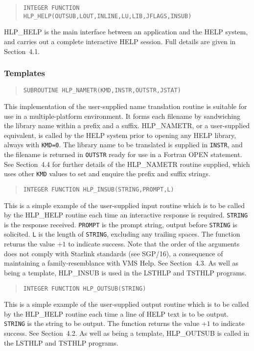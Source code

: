 \begin{verse}
\verb|INTEGER FUNCTION HLP_HELP(OUTSUB,LOUT,INLINE,LU,LIB,JFLAGS,INSUB)|
\end{verse}
HLP\_HELP is the main interface between an application and the
HELP system, and carries out a complete interactive HELP session.
Full details are given in Section~4.1.

\subsubsection{Templates}
\begin{verse}
\verb|SUBROUTINE HLP_NAMETR(KMD,INSTR,OUTSTR,JSTAT)|
\end{verse}
This implementation of the user-supplied name translation routine is
suitable for use in a multiple-platform environment.  It forms each
filename by sandwiching the library name within a prefix and a suffix.
HLP\_NAMETR, or a user-supplied equivalent, is called by the
HELP system prior to opening any HELP library, always
with \verb|KMD=0|.  The
library name to be translated is supplied in \verb|INSTR|, and
the filename is returned in \verb|OUTSTR| ready for use in a
Fortran OPEN statement.
See Section~4.4 for further details of the HLP\_NAMETR routine
supplied, which uses other \verb|KMD| values to set and enquire the
prefix and suffix strings.

\begin{verse}
\verb|INTEGER FUNCTION HLP_INSUB(STRING,PROMPT,L)|
\end{verse}
This is a simple example of the user-supplied input
routine which is to be called by the HLP\_HELP routine each
time an interactive response is required.  \verb|STRING| is the response
received. \verb|PROMPT| is the prompt string,
output before \verb|STRING| is solicited.  \verb|L| is the length
of \verb|STRING|, excluding any trailing spaces.  The function
returns the value $+1$ to indicate success.  Note that the order of
the arguments does not comply with Starlink standards (see SGP/16),
a consequence of maintaining a family-resemblance with VMS Help.  See
Section~4.3.  As well as being a template, HLP\_INSUB is used in
the LSTHLP and TSTHLP programs.

\begin{verse}
\verb|INTEGER FUNCTION HLP_OUTSUB(STRING)|
\end{verse}
This is a simple example of the user-supplied output routine which is
to be called by the HLP\_HELP routine each time a line of HELP text
is to be output.
\verb|STRING| is the string to be output.  The function
returns the value $+1$ to indicate success.  See Section~4.2.
As well as being a template, HLP\_OUTSUB is called in
the LSTHLP and TSTHLP programs.

